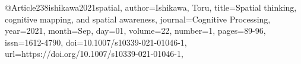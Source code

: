 @Article{238ishikawa2021spatial,
author={Ishikawa, Toru},
title={Spatial thinking, cognitive mapping, and spatial awareness},
journal={Cognitive Processing},
year={2021},
month={Sep},
day={01},
volume={22},
number={1},
pages={89-96},
issn={1612-4790},
doi={10.1007/s10339-021-01046-1},
url={https://doi.org/10.1007/s10339-021-01046-1},
}